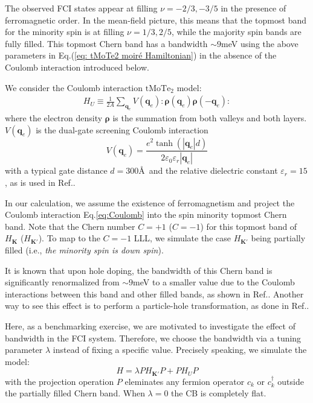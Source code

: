 The observed FCI states appear at filling $\nu=-2/3,-3/5$ in the presence of ferromagnetic order. In the mean-field picture, this means that the topmost band for the minority spin is at filling $\nu=1/3,2/5$, while the majority spin bands are fully filled. This topmost Chern band has a bandwidth $\sim 9$meV using the above parameters in Eq.(\ref{eq: tMoTe2 moiré Hamiltonian}) in the absence of the Coulomb interaction introduced below. 

We consider the Coulomb interaction $\mathrm{tMoTe_2}$ model:
\begin{align}
H_U\equiv \frac{1}{2A}\sum_{\mathbf q_e} V(\mathbf q_e):\boldsymbol\rho(\mathbf q_e)\boldsymbol\rho(-\mathbf q_e):\label{eq:Coulomb}
\end{align}
where the electron density $\boldsymbol\rho$ is the summation from both valleys and both layers. $V(\mathbf q_e)$ is the dual-gate screening Coulomb interaction
\begin{equation}
    V(\mathbf q_e)=\frac{e^2\tanh(|\mathbf q_e|d)}{2\varepsilon_0\varepsilon_r|\mathbf q_e|}
\end{equation}
with a typical gate distance $d=300$\AA~and the relative dielectric constant $\varepsilon_r=15$, as is used in Ref.\cite{wang2023fractional}.

In our calculation, we assume the existence of ferromagnetism and project the Coulomb interaction Eq.\eqref{eq:Coulomb} into the spin minority topmost Chern band. Note that the Chern number $C=+1$ ($C=-1$) for this topmost band of $H_\mathbf{K}$ ($H_{\mathbf{K'}}$). To map to the $C=-1$ LLL, we simulate the case $H_{\mathbf{K'}}$ being partially filled (i.e., \emph{the minority spin is down spin}). 


It is known that upon hole doping, the bandwidth of this Chern band is significantly renormalized from $\sim 9$meV to a smaller value due to the Coulomb interactions between this band and other filled bands, as shown in Ref.\cite{dong2023composite}. Another way to see this effect is to perform a particle-hole transformation, as done in Ref.\cite{wang2023fractional}.

Here, as a benchmarking exercise, we are motivated to investigate the effect of bandwidth in the FCI system. Therefore, we choose the bandwidth via a tuning parameter $\lambda$ instead of fixing a specific value. Precisely speaking, we simulate the model:
\begin{equation}
    H=\lambda P H_{\mathbf{K'}} P + P H_U P \label{eq:simulated_model}
\end{equation}
with the projection operation $P$ eleminates any fermion operator $c_k$ or $c^\dagger_k$ outside the partially filled Chern band. When $\lambda=0$ the CB is completely flat.

